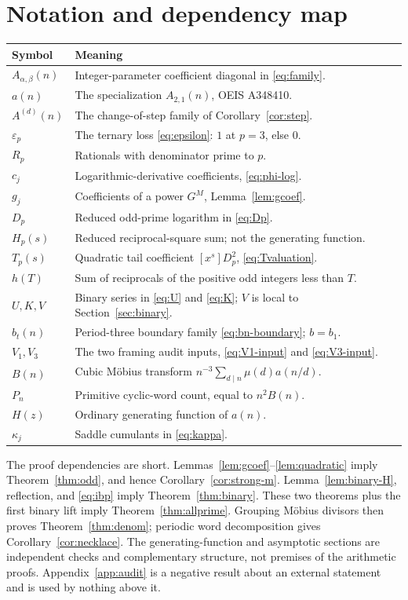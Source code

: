 \documentclass[11pt,a4paper]{article}
\numberwithin{equation}{section}
\theoremstyle{definition}
\theoremstyle{remark}
\newcommand{\eps}{\varepsilon}
\newcommand{\A}{A_{\alpha,\beta}}
\begin{document}
\section{Notation and dependency map}
\begin{center}
\small
\begin{tabular}{p{}p{}}
\toprule
Symbol & Meaning\\
\midrule
$\A(n)$ & Integer-parameter coefficient diagonal in \eqref{eq:family}.\\
$a(n)$ & The specialization $A_{2,1}(n)$, OEIS A348410.\\
$A^{(d)}(n)$ & The change-of-step family of Corollary~\ref{cor:step}.\\
$\eps_p$ & The ternary loss \eqref{eq:epsilon}: $1$ at $p=3$, else $0$.\\
$R_p$ & Rationals with denominator prime to $p$.\\
$c_j$ & Logarithmic-derivative coefficients, \eqref{eq:phi-log}.\\
$g_j$ & Coefficients of a power $G^M$, Lemma~\ref{lem:gcoef}.\\
$D_p$ & Reduced odd-prime logarithm in \eqref{eq:Dp}.\\
$H_p(s)$ & Reduced reciprocal-square sum; not the generating function.\\
$T_p(s)$ & Quadratic tail coefficient $[x^s]D_p^2$, \eqref{eq:Tvaluation}.\\
$h(T)$ & Sum of reciprocals of the positive odd integers less than $T$.\\
$U,K,V$ & Binary series in \eqref{eq:U} and \eqref{eq:K}; $V$ is local to
Section~\ref{sec:binary}.\\
$b_t(n)$ & Period-three boundary family \eqref{eq:bn-boundary};
$b=b_1$.\\
$V_1,V_3$ & The two framing audit inputs, \eqref{eq:V1-input} and
\eqref{eq:V3-input}.\\
$B(n)$ & Cubic M\"obius transform $n^{-3}\sum_{d\mid n}\mu(d)a(n/d)$.\\
$P_n$ & Primitive cyclic-word count, equal to $n^2B(n)$.\\
$H(z)$ & Ordinary generating function of $a(n)$.\\
$\kappa_j$ & Saddle cumulants in \eqref{eq:kappa}.\\
\bottomrule
\end{tabular}
\end{center}
The proof dependencies are short. Lemmas~\ref{lem:gcoef}--\ref{lem:quadratic}
imply Theorem~\ref{thm:odd}, and hence Corollary~\ref{cor:strong-m}.
Lemma~\ref{lem:binary-H}, reflection, and
\eqref{eq:ibp} imply Theorem~\ref{thm:binary}. These two theorems plus the
first binary lift imply Theorem~\ref{thm:allprime}. Grouping M\"obius divisors
then proves Theorem~\ref{thm:denom}; periodic word decomposition gives
Corollary~\ref{cor:necklace}. The generating-function and asymptotic sections
are independent checks and complementary structure, not premises of the
arithmetic proofs. Appendix~\ref{app:audit} is a negative result about an
external statement and is used by nothing above it.
\end{document}
